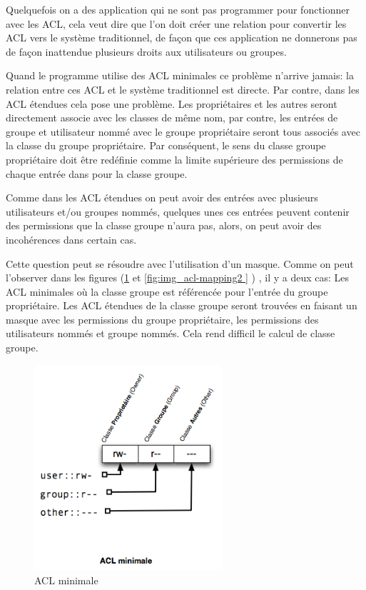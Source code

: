 Quelquefois on a des application qui ne sont pas programmer pour fonctionner avec les ACL, cela veut dire que l'on doit créer une relation pour convertir les ACL vers le système traditionnel, de façon que ces application ne donnerons pas de façon inattendue plusieurs droits aux utilisateurs ou groupes. 

Quand le programme utilise des ACL minimales ce problème n'arrive jamais: la relation entre ces ACL et le système traditionnel est directe. Par contre, dans les ACL étendues cela pose une problème. Les propriétaires et les autres seront directement associe avec les classes de même nom, par contre, les entrées de groupe et utilisateur nommé avec le groupe propriétaire seront tous associés avec la classe du groupe propriétaire. Par conséquent, le sens du classe groupe propriétaire doit être redéfinie comme la limite supérieure des permissions de chaque entrée dans pour la classe groupe.

Comme dans les ACL étendues on peut avoir des entrées avec plusieurs utilisateurs et/ou groupes nommés, quelques unes ces entrées peuvent contenir des permissions que la classe groupe n'aura pas, alors, on peut avoir des incohérences dans certain cas. 


Cette question peut se résoudre avec l'utilisation d'un masque. Comme on peut l'observer dans les figures (\ref{fig:img_acl-mapping1} et \ref{fig:img_acl-mapping2	} ) , il y a deux cas:  Les ACL minimales où la classe groupe est référencée pour l'entrée du groupe propriétaire. Les ACL étendues de la classe groupe seront trouvées en faisant un masque avec les permissions du groupe propriétaire, les permissions des utilisateurs nommés et groupe nommés. Cela rend difficil le calcul de classe groupe. 

\begin{figure}[htbp]
\centering
\includegraphics[height=3in]{img/acl-mapping-min.jpg}
\caption{ACL minimale}
\label{fig:img_acl-mapping1}
\end{figure}
 

